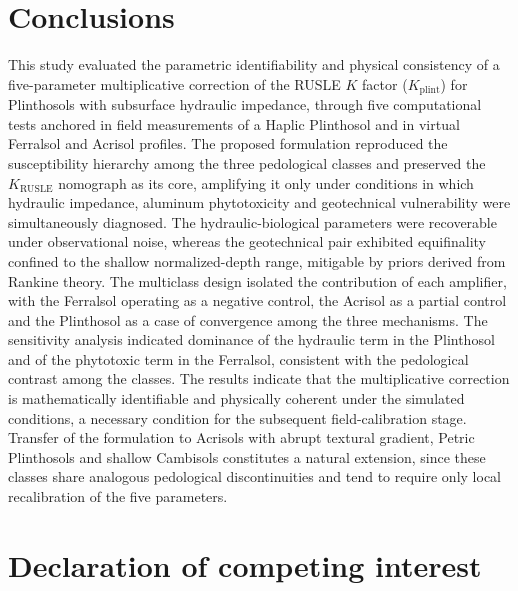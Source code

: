 \documentclass[preprint,review,12pt,authoryear]{elsarticle}
\begin{document}
\section{Conclusions}
\label{sec:conclusions}

This study evaluated the parametric identifiability and physical consistency of a five-parameter multiplicative correction of the RUSLE $K$ factor ($K_{\mathrm{plint}}$) for Plinthosols with subsurface hydraulic impedance, through five computational tests anchored in field measurements of a Haplic Plinthosol and in virtual Ferralsol and Acrisol profiles. The proposed formulation reproduced the susceptibility hierarchy among the three pedological classes and preserved the $K_{\mathrm{RUSLE}}$ nomograph as its core, amplifying it only under conditions in which hydraulic impedance, aluminum phytotoxicity and geotechnical vulnerability were simultaneously diagnosed. The hydraulic-biological parameters were recoverable under observational noise, whereas the geotechnical pair exhibited equifinality confined to the shallow normalized-depth range, mitigable by priors derived from Rankine theory. The multiclass design isolated the contribution of each amplifier, with the Ferralsol operating as a negative control, the Acrisol as a partial control and the Plinthosol as a case of convergence among the three mechanisms. The sensitivity analysis indicated dominance of the hydraulic term in the Plinthosol and of the phytotoxic term in the Ferralsol, consistent with the pedological contrast among the classes. The results indicate that the multiplicative correction is mathematically identifiable and physically coherent under the simulated conditions, a necessary condition for the subsequent field-calibration stage. Transfer of the formulation to Acrisols with abrupt textural gradient, Petric Plinthosols and shallow Cambisols constitutes a natural extension, since these classes share analogous pedological discontinuities and tend to require only local recalibration of the five parameters.

\section*{Declaration of competing interest}
\end{document}
